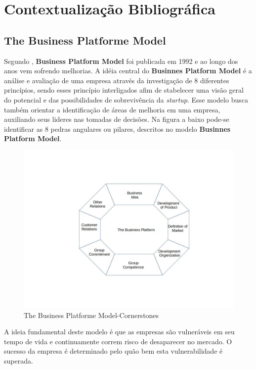 \documentclass[12pt]{article}
\begin{document}
\section{Contextualização Bibliográfica} \label{sec:Contex. Bibli}
\subsection{The Business Platforme Model}
Segundo \cite{davidsson2003business:2003}, \textbf{Business Platform Model} foi publicada em 1992 e ao longo dos anos vem sofrendo melhorias. A idéia central do \textbf{Businnes Platform Model} é a análise e avaliação de uma empresa através da investigação de 8 diferentes princípios, sendo esses princípio interligados afim de stabelecer uma visão geral do potencial e das possibilidades de sobrevivência da \textit{startup}. Esse modelo busca também orientar a identificação de áreas de melhoria em uma empresa, auxiliando seus lideres nas tomadas de decisões. Na figura a baixo pode-se identificar as 8 pedras angulares ou pilares, descritos no modelo \textbf{Businnes Platform Model}.

\begin{figure}[!ht]
\begin{center}
\includegraphics[scale=0.3]{cornerstones.jpg}
\caption{The Business Platforme Model-Cornerstones}
\pagebreak
\clearpage
\newpage
\end{center}
\end{figure}

A ideia fundamental deste modelo é que as empresas são vulneráveis em seu tempo de vida e continuamente correm risco de desaparecer no mercado. O sucesso da empresa é determinado pelo quão bem esta vulnerabilidade é superada.
\end{document}
